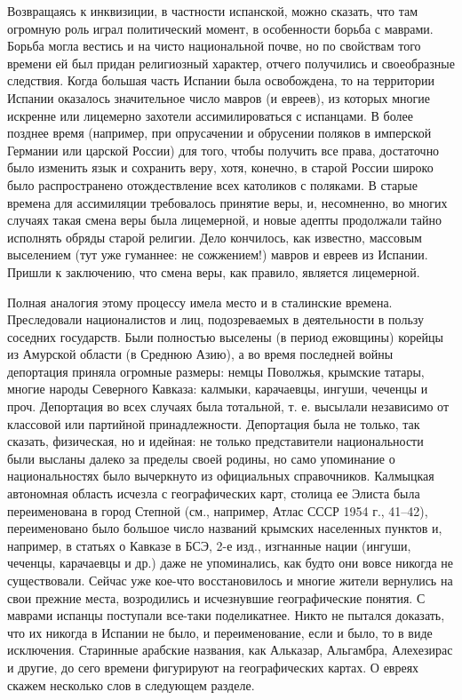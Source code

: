 Возвращаясь к инквизиции, в частности испанской, можно сказать, что там
огромную роль играл политический момент, в особенности борьба с маврами. Борьба
могла вестись и на чисто национальной почве, но по свойствам того времени ей
был придан религиозный характер, отчего получились и своеобразные следствия.
Когда большая часть Испании была освобождена, то на территории Испании
оказалось значительное число мавров (и евреев), из которых многие искренне или
лицемерно захотели ассимилироваться с испанцами. В более позднее время
(например, при опрусачении и обрусении поляков в имперской Германии или царской
России) для того, чтобы получить все права, достаточно было изменить язык и
сохранить веру, хотя, конечно, в старой России широко было распространено
отождествление всех католиков с поляками. В старые времена для ассимиляции
требовалось принятие веры, и, несомненно, во многих случаях такая смена веры
была лицемерной, и новые адепты продолжали тайно исполнять обряды старой
религии. Дело кончилось, как известно, массовым выселением (тут уже гуманнее:
не сожжением!) мавров и евреев из Испании. Пришли к заключению, что смена веры,
как правило, является лицемерной.

Полная аналогия этому процессу имела место и в сталинские времена. Преследовали
националистов и лиц, подозреваемых в деятельности в пользу соседних государств.
Были полностью выселены (в период ежовщины) корейцы из Амурской области (в
Среднюю Азию), а
во время последней войны депортация приняла огромные размеры: немцы
Поволжья, крымские татары, многие народы Северного Кавказа: калмыки,
карачаевцы, ингуши, чеченцы и проч. Депортация во всех случаях была
тотальной, т. е. высылали независимо от классовой или партийной
принадлежности. Депортация была не только, так сказать, физическая, но
и идейная: не только представители национальности были высланы далеко
за пределы своей родины, но само упоминание о национальностях было
вычеркнуто из официальных справочников. Калмыцкая автономная область
исчезла с географических карт, столица ее Элиста была переименована
в город Степной (см., например, Атлас СССР 1954 г., 41--42),
переименовано было большое число названий крымских населенных пунктов
и, например, в статьях о Кавказе в БСЭ, 2-е изд., изгнанные нации
(ингуши, чеченцы, карачаевцы и др.) даже не упоминались, как будто они
вовсе никогда не существовали. Сейчас уже кое-что восстановилось
и многие жители вернулись на свои прежние места, возродились и
исчезнувшие географические понятия. С маврами испанцы поступали
все-таки поделикатнее. Никто не пытался доказать, что их никогда в
Испании не было, и переименование, если и было, то в виде исключения.
Старинные арабские названия, как Альказар, Альгамбра, Алехезирас и
другие, до сего времени фигурируют на географических картах. О евреях
скажем несколько слов в следующем разделе.

